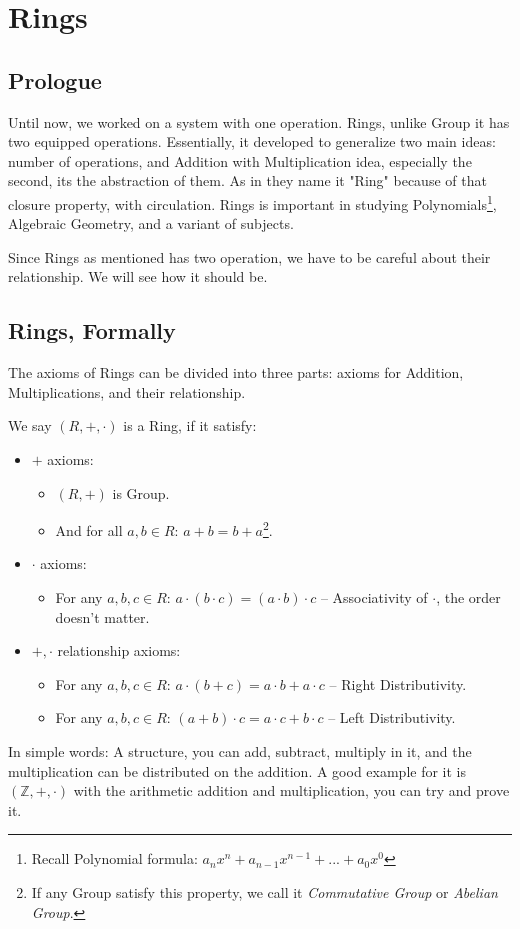 \section{Rings \label{ring}}
\subsection{Prologue}
Until now, we worked on a system with one operation. Rings, unlike Group it has two equipped operations. Essentially, it developed to generalize two main ideas: number of operations, and Addition with Multiplication idea, especially the second, its the abstraction of them. As in \cite{61505} they name it "Ring" because of that closure property, with circulation. Rings is important in studying Polynomials\footnote{Recall Polynomial formula: $a_nx^n+a_{n-1}x^{n-1}+...+a_0x^{0}$}, Algebraic Geometry, and a variant of subjects.

Since Rings as mentioned has two operation, we have to be careful about their relationship. We will see how it should be.
\subsection{Rings, Formally}
The axioms of Rings can be divided into three parts: axioms for Addition, Multiplications, and their relationship.

We say $(R,+,\cdot)$ is a Ring, if it satisfy:
\begin{itemize}
    \item $+$ axioms:
    \begin{itemize}
        \item $(R,+)$ is Group. 
        \item And for all $a,b \in R$: $a+b=b+a$\footnote{If any Group satisfy this property, we call it {\it Commutative Group} or {\it Abelian Group}.}.
    \end{itemize}
    \item $\cdot$ axioms:
    \begin{itemize}
        \item For any $a,b,c \in R$: $a \cdot (b \cdot c) = (a \cdot b) \cdot c$ -- Associativity of $\cdot$, the order doesn't matter.
    \end{itemize}
    
    \item $+,\cdot $ relationship axioms:
    \begin{itemize}
        \item For any $a,b,c \in R$: $a \cdot (b + c) = a \cdot b + a \cdot c$ -- Right Distributivity.
        \item For any $a,b,c \in R$: $(a + b) \cdot c = a \cdot c + b \cdot c$ -- Left Distributivity.
    \end{itemize}
\end{itemize}

In simple words: A structure, you can add, subtract, multiply in it, and the multiplication can be distributed on the addition. A good example for it is $(\mathbb{Z},+,\cdot)$ with the arithmetic addition and multiplication, you can try and prove it.